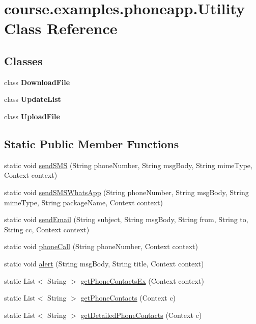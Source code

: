 \hypertarget{classcourse_1_1examples_1_1phoneapp_1_1_utility}{}\section{course.\+examples.\+phoneapp.\+Utility Class Reference}
\label{classcourse_1_1examples_1_1phoneapp_1_1_utility}
\subsection*{Classes}
\begin{DoxyCompactItemize}
\item 
class {\bfseries Download\+File}
\item 
class {\bfseries Update\+List}
\item 
class {\bfseries Upload\+File}
\end{DoxyCompactItemize}
\subsection*{Static Public Member Functions}
\begin{DoxyCompactItemize}
\item 
static void \hyperlink{classcourse_1_1examples_1_1phoneapp_1_1_utility_a5f33366b0ef1f6e6cc3e25c35dc1e0b6}{send\+S\+M\+S} (String phone\+Number, String msg\+Body, String mime\+Type, Context context)
\item 
static void \hyperlink{classcourse_1_1examples_1_1phoneapp_1_1_utility_a8b997770364b4ae7620db3e18716ec2d}{send\+S\+M\+S\+Whats\+App} (String phone\+Number, String msg\+Body, String mime\+Type, String package\+Name, Context context)
\item 
static void \hyperlink{classcourse_1_1examples_1_1phoneapp_1_1_utility_a1435fdd4dd435034a5d866a6d586e68a}{send\+Email} (String subject, String msg\+Body, String from, String to, String cc, Context context)
\item 
static void \hyperlink{classcourse_1_1examples_1_1phoneapp_1_1_utility_a6532b2cd02df1fa71b50362636401628}{phone\+Call} (String phone\+Number, Context context)
\item 
static void \hyperlink{classcourse_1_1examples_1_1phoneapp_1_1_utility_a52a9f17fcb5689b3da8038811ee6abf4}{alert} (String msg\+Body, String title, Context context)
\item 
static List$<$ String $>$ \hyperlink{classcourse_1_1examples_1_1phoneapp_1_1_utility_ab87f4ad40f39634a8705bb47ae674727}{get\+Phone\+Contacts\+Ex} (Context context)
\item 
static List$<$ String $>$ \hyperlink{classcourse_1_1examples_1_1phoneapp_1_1_utility_a5ef96751af1965557ef365d7426044fa}{get\+Phone\+Contacts} (Context c)
\item 
static List$<$ String $>$ \hyperlink{classcourse_1_1examples_1_1phoneapp_1_1_utility_aa34007fd1fb09ca6de7861b30690c942}{get\+Detailed\+Phone\+Contacts} (Context c)
\end{DoxyCompactItemize}
